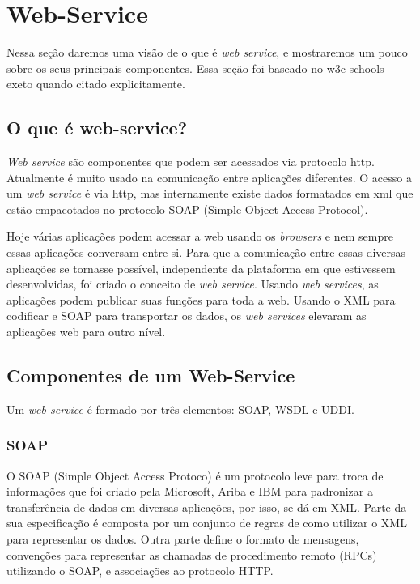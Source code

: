 \section{Web-Service}


Nessa seção daremos uma visão de o que é \textit{web service}, e mostraremos um pouco sobre os seus principais componentes. Essa seção foi baseado no w3c schools ~\cite{w3cs} exeto quando citado explicitamente.

\subsection{O que é web-service?}

\textit{Web service} são componentes que podem ser acessados via protocolo http. Atualmente é muito usado na comunicação entre aplicações diferentes. O acesso a um \textit{web service} é via http, mas internamente existe dados formatados em xml que estão empacotados no protocolo SOAP (Simple Object Access Protocol).

Hoje várias aplicações podem acessar a web usando os \textit{browsers} e nem sempre essas aplicações conversam entre si. Para que a comunicação entre essas diversas aplicações se tornasse possível, independente da plataforma em que estivessem desenvolvidas, foi criado o conceito de \textit{web service}. Usando \textit{web services}, as aplicações podem publicar suas funções para toda a web. Usando o XML para codificar e SOAP para transportar os dados, os \textit{web services} elevaram as aplicações web para outro nível.

\subsection{Componentes de um Web-Service}

Um \textit{web service} é formado por três elementos: SOAP, WSDL e UDDI.

\subsubsection{SOAP}


O SOAP (Simple Object Access Protoco) é um protocolo leve para troca de informações que foi criado pela Microsoft, Ariba e IBM para padronizar a transferência de dados em diversas aplicações, por isso, se dá em XML. Parte da sua especificação é composta por um conjunto de regras de como utilizar o XML para representar os dados. Outra parte define o formato de mensagens, convenções para representar as chamadas de procedimento remoto (RPCs) utilizando o SOAP, e associações ao protocolo HTTP. 

